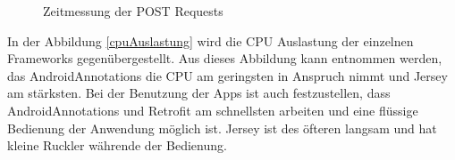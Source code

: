 \begin{figure} [ht]
	\centering
	 \qquad
	 \qquad
	 \qquad
	\caption{Zeitmessung der POST Requests} 
	\label{postRequests}
\end{figure} 

In der Abbildung \ref{cpuAuslastung} wird die CPU Auslastung der einzelnen Frameworks gegenübergestellt. Aus dieses Abbildung kann entnommen werden, das AndroidAnnotations die CPU am geringsten in Anspruch nimmt und Jersey am stärksten. Bei der Benutzung der Apps ist auch festzustellen, dass AndroidAnnotations und Retrofit am schnellsten arbeiten und eine flüssige Bedienung der Anwendung möglich ist. Jersey ist des öfteren langsam und hat kleine Ruckler währende der Bedienung.  

